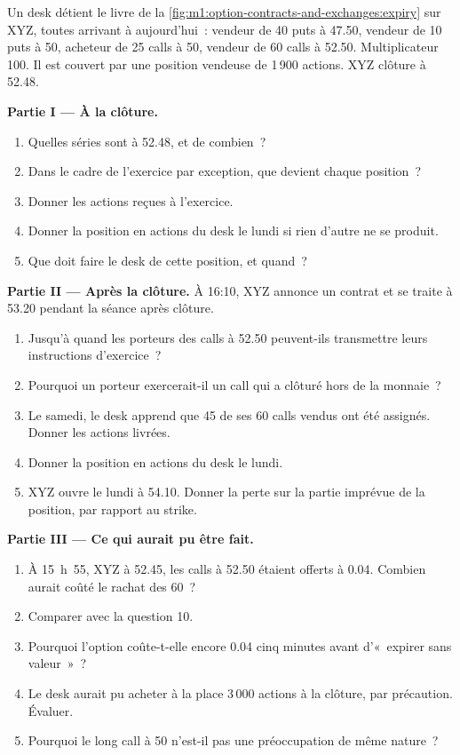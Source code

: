\begin{problem}\label{pb:m1:option-contracts-and-exchanges:1}
Un desk détient le livre de la \cref{fig:m1:option-contracts-and-exchanges:expiry}
sur XYZ, toutes arrivant à  aujourd'hui~: vendeur de 40 puts à 47.50, vendeur de 10 puts à 50, acheteur de
25 calls à 50, vendeur de 60 calls à 52.50. Multiplicateur 100. Il est couvert par une
position vendeuse de 1\,900 actions. XYZ clôture à 52.48.

\medskip\noindent\textbf{Partie I --- À la clôture.}
\begin{enumerate}
\item Quelles séries sont  à 52.48, et de combien~?
\item Dans le cadre de l'exercice par exception, que devient chaque position~?
\item Donner les actions reçues à l'exercice.
\item Donner la position en actions du desk le lundi si rien d'autre ne se produit.
\item Que doit faire le desk de cette position, et quand~?
\end{enumerate}

\medskip\noindent\textbf{Partie II --- Après la clôture.}
À 16:10, XYZ annonce un contrat et se traite à 53.20 pendant la
séance après clôture.
\begin{enumerate}[resume]
\item Jusqu'à quand les porteurs des calls à 52.50 peuvent-ils transmettre leurs
instructions d'exercice~?
\item Pourquoi un porteur exercerait-il un call qui a clôturé hors de la monnaie~?
\item Le samedi, le desk apprend que 45 de ses 60 calls vendus ont été
assignés. Donner les actions livrées.
\item Donner la position en actions du desk le lundi.
\item XYZ ouvre le lundi à 54.10. Donner la perte sur la partie imprévue de
la position, par rapport au strike.
\end{enumerate}

\medskip\noindent\textbf{Partie III --- Ce qui aurait pu être fait.}
\begin{enumerate}[resume]
\item À 15~h~55, XYZ à 52.45, les calls à 52.50 étaient offerts à 0.04. Combien
aurait coûté le rachat des 60~?
\item Comparer avec la question 10.
\item Pourquoi l'option coûte-t-elle encore 0.04 cinq minutes avant
d'«~expirer sans valeur~»~?
\item Le desk aurait pu acheter à la place 3\,000 actions à la clôture, par
précaution. Évaluer.
\item Pourquoi le long call à 50 n'est-il pas une préoccupation de même nature~?
\end{enumerate}


\end{problem}
